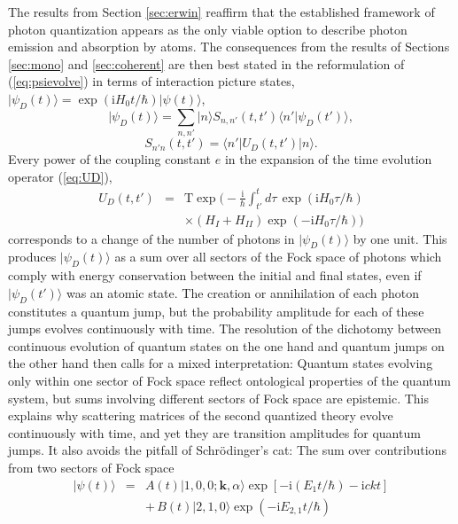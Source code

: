 \documentclass[final,3p,12pt]{elsarticle3}
\begin{document}
The results from Section \ref{sec:erwin} reaffirm that the established framework 
of photon quantization appears as the only viable option to describe photon 
emission and absorption by atoms. The consequences from the results of 
Sections \ref{sec:mono} and \ref{sec:coherent} are then best stated in the 
reformulation of (\ref{eq:psievolve}) in terms of interaction picture 
states, $\bm{|}\psi_D(t)\bm{\rangle}=\exp(\mathrm{i}H_0t/\hbar)\bm{|}\psi(t)\bm{\rangle}$,
\begin{equation}\label{eq:psievolveD}
\bm{|}\psi_D(t)\bm{\rangle}=\sum_{n,n'}\bm{|}n\bm{\rangle} S_{n,n'}(t,t')
\bm{\langle} n'\bm{|}\psi_D(t')\bm{\rangle},
\end{equation}
\[
S_{n'n}(t,t')=\bm{\langle} n'\bm{|}U_D(t,t')\bm{|}n\bm{\rangle}.
\]
Every power of the coupling constant $e$ in the expansion of the time evolution 
operator (\ref{eq:UD}),
\begin{eqnarray}\nonumber
U_D(t,t')&=&\mathrm{T}\exp\Bigg(-\frac{\mathrm{i}}{\hbar}\int_{t'}^t\!d\tau\,
\exp(\mathrm{i}H_0\tau/\hbar)
\\ \label{eq:UD2}
&&\times
(H_I+H_{II})\exp(-\mathrm{i}H_0\tau/\hbar)\Bigg)
\end{eqnarray}
corresponds to a change of the number of photons in $\bm{|}\psi_D(t)\bm{\rangle}$ by 
one unit. This produces $\bm{|}\psi_D(t)\bm{\rangle}$ as a sum over all sectors of 
the Fock space of photons which comply with energy conservation between the initial 
and final states, even if $\bm{|}\psi_D(t')\bm{\rangle}$ was an atomic state. The 
creation or annihilation of each photon constitutes a quantum jump, but the 
probability amplitude for each of these jumps evolves continuously with time.
The resolution of the dichotomy between continuous evolution of quantum states
on the one hand and quantum jumps on the other hand then calls for a mixed
interpretation: Quantum states evolving only within one sector of Fock space
reflect ontological properties of the quantum system, but sums involving different 
sectors of Fock space are epistemic. This explains why scattering matrices of the 
second quantized theory evolve continuously with time, and yet they are transition 
amplitudes for quantum jumps. It also avoids the pitfall of Schr\"odinger's cat:
The sum over contributions from two sectors of Fock space
\begin{eqnarray}\nonumber
\bm{|}\psi(t)\bm{\rangle}&=&A(t)\bm{|}1,0,0;\bm{k},\alpha\bm{\rangle}
\exp[-\mathrm{i}(E_{1}t/\hbar)-\mathrm{i}ckt]
\\ \label{eq:psi2}
&&+\,B(t)\bm{|}2,1,0\bm{\rangle}\exp(-\mathrm{i}E_{2,1}t/\hbar)
\end{eqnarray}
\end{document}
